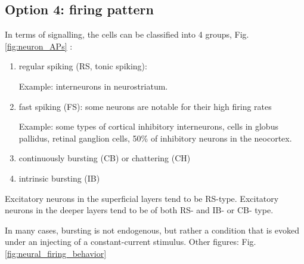 
\subsection{Option 4: firing pattern}
\label{sec:neuron-classify-spiking-fast-regular-bursting}
\label{sec:regular-spiking-pattern}
\label{sec:fast-spiking-pattern}
\label{sec:intrinsic-bursting-pattern}

In terms of signalling, the cells can be classified into 4 groups,
Fig.\ref{fig:neuron_APs} \citep{nowak2003}:
\begin{enumerate}
\item regular spiking (RS, tonic spiking): 

Example: interneurons in neurostriatum.

\item fast spiking (FS): some neurons are notable for their high firing rates

Example: some types of cortical inhibitory interneurons, cells in globus
pallidus, retinal ganglion cells, 50\% of inhibitory neurons in the neocortex.

\item continuously bursting (CB) or chattering (CH)

\item intrinsic bursting (IB)

\end{enumerate}

Excitatory neurons in the superficial layers tend to be
RS-type. Excitatory neurons in the deeper layers tend to be of both
RS- and IB- or CB- type. 

In many cases, bursting is not endogenous, but rather a condition that is
evoked under an injecting of a constant-current stimulus. Other figures:
Fig.\ref{fig:neural_firing_behavior}

